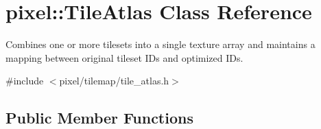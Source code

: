 \hypertarget{classpixel_1_1_tile_atlas}{}\section{pixel\+:\+:Tile\+Atlas Class Reference}
\label{classpixel_1_1_tile_atlas}


Combines one or more tilesets into a single texture array and maintains a mapping between original tileset I\+Ds and optimized I\+Ds.  




{\ttfamily \#include $<$pixel/tilemap/tile\+\_\+atlas.\+h$>$}

\subsection*{Public Member Functions}
